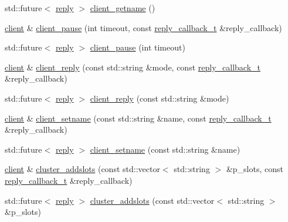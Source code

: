 \begin{DoxyCompactItemize}
\item 
std\+::future$<$ \hyperlink{classcpp__redis_1_1reply}{reply} $>$ \hyperlink{classcpp__redis_1_1client_a89068e68b418906e9e34cb9a95f7a179}{client\+\_\+getname} ()
\item 
\hyperlink{classcpp__redis_1_1client}{client} \& \hyperlink{classcpp__redis_1_1client_acdf001d60d1d82d3f090b7c679e3183e}{client\+\_\+pause} (int timeout, const \hyperlink{classcpp__redis_1_1client_a061a1140d36d2eaeda82b09a0bb3f9f2}{reply\+\_\+callback\+\_\+t} \&reply\+\_\+callback)
\item 
std\+::future$<$ \hyperlink{classcpp__redis_1_1reply}{reply} $>$ \hyperlink{classcpp__redis_1_1client_a2c73a6f9b2e3f1a0afbaca9fddd29199}{client\+\_\+pause} (int timeout)
\item 
\hyperlink{classcpp__redis_1_1client}{client} \& \hyperlink{classcpp__redis_1_1client_a5e49e9bf9bb72659b33013fac751a712}{client\+\_\+reply} (const std\+::string \&mode, const \hyperlink{classcpp__redis_1_1client_a061a1140d36d2eaeda82b09a0bb3f9f2}{reply\+\_\+callback\+\_\+t} \&reply\+\_\+callback)
\item 
std\+::future$<$ \hyperlink{classcpp__redis_1_1reply}{reply} $>$ \hyperlink{classcpp__redis_1_1client_a1b378de0c1805069b9bbecd4fca4091c}{client\+\_\+reply} (const std\+::string \&mode)
\item 
\hyperlink{classcpp__redis_1_1client}{client} \& \hyperlink{classcpp__redis_1_1client_a5c7f977196c1c00e3c732615c0d86ae7}{client\+\_\+setname} (const std\+::string \&name, const \hyperlink{classcpp__redis_1_1client_a061a1140d36d2eaeda82b09a0bb3f9f2}{reply\+\_\+callback\+\_\+t} \&reply\+\_\+callback)
\item 
std\+::future$<$ \hyperlink{classcpp__redis_1_1reply}{reply} $>$ \hyperlink{classcpp__redis_1_1client_aa1ab41fda6b2536f652720b7720a0b63}{client\+\_\+setname} (const std\+::string \&name)
\item 
\hyperlink{classcpp__redis_1_1client}{client} \& \hyperlink{classcpp__redis_1_1client_ac156d5593e1800742188f0eee9016a84}{cluster\+\_\+addslots} (const std\+::vector$<$ std\+::string $>$ \&p\+\_\+slots, const \hyperlink{classcpp__redis_1_1client_a061a1140d36d2eaeda82b09a0bb3f9f2}{reply\+\_\+callback\+\_\+t} \&reply\+\_\+callback)
\item 
std\+::future$<$ \hyperlink{classcpp__redis_1_1reply}{reply} $>$ \hyperlink{classcpp__redis_1_1client_a0e14578c1addf1de66745a8a95e66aeb}{cluster\+\_\+addslots} (const std\+::vector$<$ std\+::string $>$ \&p\+\_\+slots)
\item 

\end{DoxyCompactItemize}
